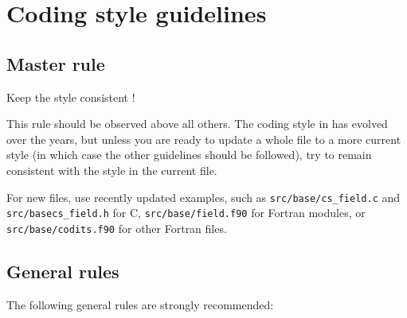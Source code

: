 
%
%
%
%


\section{Coding style guidelines}

\subsection{Master rule}

Keep the style consistent !

This rule should be observed above all others. The coding style in \CS
has evolved over the years, but unless you are ready to update a whole
file to a more current style (in which case the other guidelines should be
followed), try to remain consistent with the style in the current file.

For new files, use recently updated examples, such as
\texttt{src/base/cs\_field.c} and  \texttt{src/basecs\_field.h} for C,
\texttt{src/base/field.f90} for Fortran modules, or
\texttt{src/base/codits.f90} for other Fortran files.

\subsection{General rules}

The following general rules are strongly recommended:

